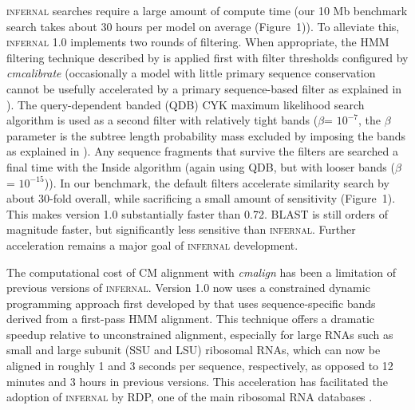 \textsc{infernal} searches require a large amount of compute time (our
10 Mb benchmark search takes about 30 hours per model on average
(Figure~1)). To alleviate this, \textsc{infernal} 1.0 implements two
rounds of filtering.  When appropriate, the HMM filtering technique
described by \citet{WeinbergRuzzo06} is applied first with filter
thresholds configured by \emph{cmcalibrate} (occasionally a model with
little primary sequence conservation cannot be usefully accelerated by
a primary sequence-based filter as explained in \citep{infguide03}).  The
query-dependent banded (QDB) CYK maximum likelihood search algorithm
is used as a second filter with relatively tight bands ($\beta$=
$10^{-7}$, the $\beta$ parameter is the subtree length probability
mass excluded by imposing the bands as explained in
\citep{NawrockiEddy07}).  Any sequence fragments that survive the
filters are searched a final time with the Inside algorithm (again
using QDB, but with looser bands ($\beta$= $10^{-15}$)).  In our
benchmark, the default filters accelerate similarity search by about
30-fold overall, while sacrificing a small amount of sensitivity
(Figure~1). This makes version 1.0 substantially faster than
0.72. \textsc{BLAST} is still orders of magnitude faster, but
significantly less sensitive than \textsc{infernal}. Further
acceleration remains a major goal of \textsc{infernal} development.

The computational cost of CM alignment with \emph{cmalign} has been a
limitation of previous versions of \textsc{infernal}. Version 1.0 now
uses a constrained dynamic programming approach first developed by
\citet{Brown00} that uses sequence-specific bands derived from a
first-pass HMM alignment. This technique offers a dramatic speedup
relative to unconstrained alignment, especially for large RNAs such as
small and large subunit (SSU and LSU) ribosomal RNAs, which can now be
aligned in roughly 1 and 3 seconds per sequence, respectively, as
opposed to 12 minutes and 3 hours in previous versions.  This
acceleration has facilitated the adoption of \textsc{infernal} by RDP,
one of the main ribosomal RNA databases \citep{Cole09}.


